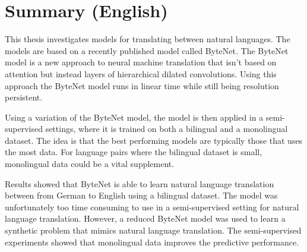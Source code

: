 \chapter{Summary (English)}

This thesis investigates models for translating between natural languages. The models are based on a recently published model called ByteNet. The ByteNet model is a new approach to neural machine translation that isn't based on attention but instead layers of hierarchical dilated convolutions. Using this approach the ByteNet model runs in linear time while still being resolution persistent.

Using a variation of the ByteNet model, the model is then applied in a semi-supervised settings, where it is trained on both a bilingual and a monolingual dataset. The idea is that the best performing models are typically those that uses the most data. For language pairs where the bilingual dataset is small, monolingual data could be a vital supplement.

Results showed that ByteNet is able to learn natural language translation between from German to English using a bilingual dataset. The model was unfortunately too time consuming to use in a semi-supervised setting for natural language translation. However, a reduced ByteNet model was used to learn a synthetic problem that mimics natural language translation. The semi-supervised experiments showed that monolingual data improves the predictive performance.
